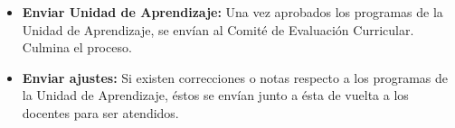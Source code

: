 \begin{itemize}
	\item \textbf{Enviar Unidad de Aprendizaje:}  Una vez aprobados los programas de la Unidad de Aprendizaje, se envían al Comité de Evaluación Curricular. Culmina el proceso.
	\item \textbf{Enviar ajustes:} Si existen correcciones o notas respecto a los programas de la Unidad de Aprendizaje, éstos se envían junto a ésta de vuelta a los docentes para ser atendidos.    
	 
	 
	

\end{itemize}